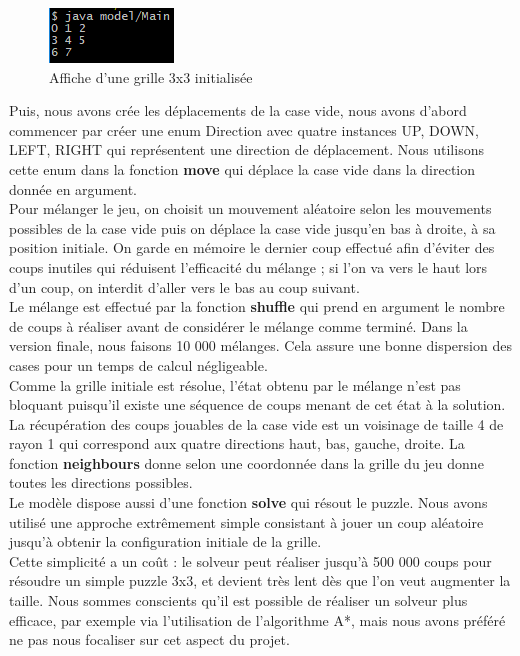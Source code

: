 \documentclass[a4paper,12pt]{article} %
\begin{document}
\begin{figure}[!h]
\centering
\includegraphics[scale=1]{images/Capture2.PNG}
\caption{Affiche d'une grille 3x3 initialisée}
\end{figure}

Puis, nous avons crée les déplacements de la case vide, nous avons d'abord commencer par créer une enum Direction avec quatre instances UP, DOWN, LEFT, RIGHT qui représentent une direction de déplacement. Nous utilisons cette enum dans la fonction \textbf{move} qui déplace la case vide dans la direction donnée en argument.\\

Pour mélanger le jeu, on choisit un mouvement aléatoire selon les mouvements possibles de la case vide puis on déplace la case vide jusqu'en bas à droite, à sa position initiale. On garde en mémoire le dernier coup effectué afin d'éviter des coups inutiles qui réduisent l'efficacité du mélange ; si l'on va vers le haut lors d'un coup, on interdit d'aller vers le bas au coup suivant.\\
Le mélange est effectué par la fonction \textbf{shuffle} qui prend en argument le nombre de coups à réaliser avant de considérer le mélange comme terminé. Dans la version finale, nous faisons 10 000 mélanges. Cela assure une bonne dispersion des cases pour un temps de calcul négligeable.\\
Comme la grille initiale est résolue, l'état obtenu par le mélange n'est pas bloquant puisqu'il existe une séquence de coups menant de cet état à la solution.\\

La récupération des coups jouables de la case vide est un voisinage de taille 4 de rayon 1 qui correspond aux quatre directions haut, bas, gauche, droite. La fonction \textbf{neighbours} donne selon une coordonnée dans la grille du jeu donne toutes les directions possibles.\\

Le modèle dispose aussi d'une fonction \textbf{solve} qui résout le puzzle. Nous avons utilisé une approche extrêmement simple consistant à jouer un coup aléatoire jusqu'à obtenir la configuration initiale de la grille.\\
Cette simplicité a un coût : le solveur peut réaliser jusqu'à 500 000 coups pour résoudre un simple puzzle 3x3, et devient très lent dès que l'on veut augmenter la taille.
Nous sommes conscients qu'il est possible de réaliser un solveur plus efficace, par exemple via l'utilisation de l'algorithme A*, mais nous avons préféré ne pas nous focaliser sur cet aspect du projet.\\
\end{document}
